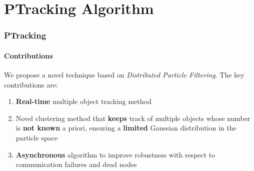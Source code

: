 \section{PTracking Algorithm}

%	
%	

\begin{frame}
	\frametitle{PTracking}
	\framesubtitle{Contributions}
	
	\Large
	
	\vspace{0.2cm}
	
	We propose a novel technique based on \emph{Distributed Particle Filtering}. The key contributions
	are:
	
	\vspace{0.15cm}
	
	\begin{enumerate}
		\item \textbf{Real-time} multiple object tracking method
		\item Novel clustering method that \textbf{keeps} track of multiple objects whose number is
			  \textbf{not known} a priori, ensuring a \textbf{limited} Gaussian distribution in the
			  particle space
		\item \textbf{Asynchronous} algorithm to improve robustness with respect to communication
			  failures and dead nodes
	\end{enumerate}
\end{frame}

